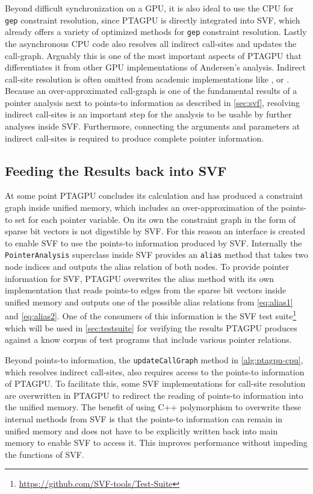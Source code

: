 Beyond difficult synchronization on a GPU, it is also ideal to use the CPU for \verb|gep| constraint resolution, since PTAGPU is directly integrated into SVF, which already offers a variety of optimized methods for \verb|gep| constraint resolution.
Lastly the asynchronous CPU code also resolves all indirect call-sites and updates the call-graph. 
Arguably this is one of the most important aspects of PTAGPU that differentiates it from other GPU implementations of Andersen's analysis.
Indirect call-site resolution is often omitted from academic implementations like \cite{mendez2012gpu}, \cite{zuo2021systemizing} or \cite{su2014parallel}.
Because an over-approximated call-graph is one of the fundamental results of a pointer analysis next to points-to information as described in \autoref{sec:svf}, resolving indirect call-sites is an important step for the analysis to be usable by further analyses inside SVF. Furthermore, connecting the arguments and parameters at indirect call-sites is required to produce complete pointer information.
\subsection{Feeding the Results back into SVF}\label{sec:feedingback}
At some point PTAGPU concludes its calculation and has produced a constraint graph inside unified memory, which includes an over-approximation of the points-to set for each pointer variable.
On its own the constraint graph in the form of sparse bit vectors is not digestible by SVF. For this reason an interface is created to enable SVF to use the points-to information produced by SVF.
Internally the \verb|PointerAnalysis| superclass inside SVF provides an \verb|alias| method that takes two node indices and outputs the alias relation of both nodes.
To provide pointer information for SVF, PTAGPU overwrites the alias method with its own implementation that reads points-to edges from the sparse bit vectors inside unified memory and outputs one of the possible alias relations from \autoref{eq:alias1} and \autoref{eq:alias2}.
One of the consumers of this information is the SVF test suite\footnote{\url{https://github.com/SVF-tools/Test-Suite}} which will be used in \autoref{sec:testsuite} for verifying the results PTAGPU produces against a know corpus of test programs that include various pointer relations.

Beyond points-to information, the \verb|updateCallGraph| method in \autoref{alg:ptagpu-cpu}, which resolves indirect call-sites, also requires access to the points-to information of PTAGPU. To facilitate this, some SVF implementations for call-site resolution are overwritten in PTAGPU to redirect the reading of points-to information into the unified memory.
The benefit of using C++ polymorphism to overwrite these internal methods from SVF is that the points-to information can remain in unified memory and does not have to be explicitly written back into main memory to enable SVF to access it.
This improves performance without impeding the functions of SVF.
